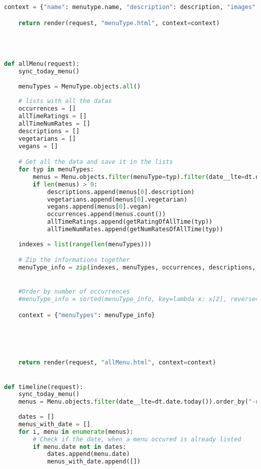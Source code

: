 \begin{lstlisting}[language=Python]
    context = {"name": menutype.name, "description": description, "images": images, "vegetarian": vegetarian, "vegan": vegan, "menu_instances": menu_instances, "occurrences": occurrences, "allTimeRating": allTimeRating, "allTimeNumRates": allTimeNumRates}

    return render(request, "menuType.html", context=context)




def allMenu(request):
    sync_today_menu()
    
    menuTypes = MenuType.objects.all()
    
    # lists with all the datas
    occurrences = []
    allTimeRatings = []
    allTimeNumRates = []
    descriptions = []
    vegetarians = []
    vegans = []

    # Get all the data and save it in the lists
    for typ in menuTypes:
        menus = Menu.objects.filter(menuType=typ).filter(date__lte=dt.date.today())
        if len(menus) > 0:
            descriptions.append(menus[0].description)
            vegetarians.append(menus[0].vegetarian)
            vegans.append(menus[0].vegan)
            occurrences.append(menus.count())
            allTimeRatings.append(getRatingOfAllTime(typ))
            allTimeNumRates.append(getNumRatesOfAllTime(typ))
        
    indexes = list(range(len(menuTypes))) 

    # Zip the informations together
    menuType_info = zip(indexes, menuTypes, occurrences, descriptions, vegetarians, vegans, allTimeRatings, allTimeNumRates)


    #Order by number of occurrences
    #menuType_info = sorted(menuType_info, key=lambda x: x[2], reverse=True)  # Sort the menu info after occurrences -> lowest to highest

    context = {"menuTypes": menuType_info}


    
   

    return render(request, "allMenu.html", context=context)


def timeline(request):
    sync_today_menu()
    menus = Menu.objects.filter(date__lte=dt.date.today()).order_by("-date")
    
    dates = []
    menus_with_date = []
    for i, menu in enumerate(menus):
        # Check if the date, when a menu occured is already listed 
        if menu.date not in dates:
            dates.append(menu.date)
            menus_with_date.append([])
        

\end{lstlisting}
